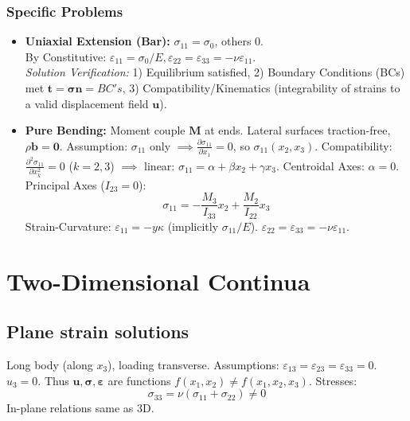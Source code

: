 \documentclass[10pt,twocolumn, a4paper]{article}
\begin{document}
\subsubsection*{Specific Problems}
\begin{itemize}
    \item \textbf{Uniaxial Extension (Bar):} $\sigma_{11} = \sigma_0$, others 0. \\By Constitutive: $\varepsilon_{11} = \sigma_0/E, \varepsilon_{22} = \varepsilon_{33} = -\nu \varepsilon_{11}$. \\
    \textit{Solution Verification:} 1) Equilibrium satisfied, 2) Boundary Conditions (BCs) met $\bm{t}=\bm{\sigma n} = BC's$, 3) Compatibility/Kinematics (integrability of strains to a valid displacement field $\bm{u}$).
    \item \textbf{Pure Bending:} Moment couple $\bm{M}$ at ends. Lateral surfaces traction-free, $\rho \bm{b} = \bm{0}$.
        \subitem Assumption: $\sigma_{11}$ only $\implies \frac{\partial \sigma_{11}}{\partial x_1}=0$, so $\sigma_{11}(x_2, x_3)$.
        \subitem Compatibility: $\frac{\partial^2 \sigma_{11}}{\partial x_k^2}=0$ ($k=2,3$)
        \subitem $\implies$ linear: $\sigma_{11} = \alpha + \beta x_2 + \gamma x_3$.
        \subitem Centroidal Axes: $\alpha = 0$. Principal Axes ($I_{23}=0$):
        \[ \sigma_{11} = -\frac{M_3}{I_{33}}x_2 + \frac{M_2}{I_{22}}x_3 \]
        \subitem Strain-Curvature: $\varepsilon_{11} = -y\kappa$ (implicitly $\sigma_{11}/E$). $\varepsilon_{22} = \varepsilon_{33} = -\nu \varepsilon_{11}$.
\end{itemize}

\section{Two-Dimensional Continua}

\subsection{Plane strain solutions}
Long body (along $x_3$), loading transverse.
Assumptions: $\varepsilon_{13} = \varepsilon_{23} = \varepsilon_{33} = 0$. $u_3 = 0$. Thus $\bm{u}, \bm{\sigma}, \bm{\varepsilon}$ are functions $f(x_1,x_2) \neq f(x_1,x_2,x_3)$. 
Stresses:
\[ \sigma_{33} = \nu(\sigma_{11} + \sigma_{22}) \neq 0 \]
In-plane relations same as 3D.
\end{document}
